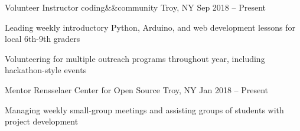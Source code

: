 


\begin{cventries}

  \cventry
  {Volunteer Instructor}
  {coding\&\&community}
  {Troy, NY}
  {Sep 2018 -- Present}
  {
    \begin{cvitems}
      \item Leading weekly introductory Python, Arduino, and web development lessons for local 6th-9th graders
      \item Volunteering for multiple outreach programs throughout year, including hackathon-style events
    \end{cvitems}
  }


  \cventry
  {Mentor}
  {Rensselaer Center for Open Source}
  {Troy, NY}
  {Jan 2018 -- Present}
  {
    \begin{cvitems}
      \item Managing weekly small-group meetings and assisting groups of students with project development
    \end{cvitems}
  }



\end{cventries}
